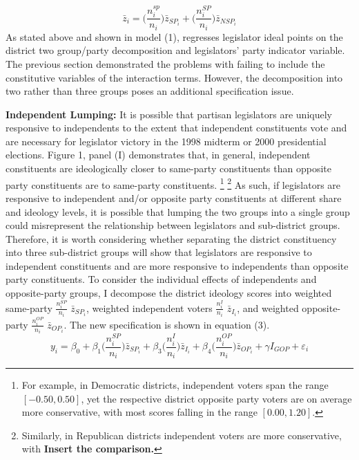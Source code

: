 \documentclass[10pt,letterpaper]{article}
\begin{document}
\begin{equation}
\bar{z}_i = \bigg( \frac{n_i^{sp}}{n_i} \bigg) \bar{z}_{SP_i} + \bigg( \frac{n_i^{SP}}{n_i} \bigg) \bar{z}_{NSP_i}
\end{equation}
As stated above and shown in model (1), \cite{Clinton2006} regresses legislator ideal points on the district two group/party decomposition and legislators' party indicator variable. The previous section demonstrated the problems with failing to include the constitutive variables of the interaction terms. However, the decomposition into two rather than three groups poses an additional specification issue.

\textbf{Independent Lumping:} It is possible that partisan legislators are uniquely responsive to independents to the extent that independent constituents vote and are necessary for legislator victory in the 1998 midterm or 2000 presidential elections.
Figure 1, panel (I) demonstrates that, in general, independent constituents are ideologically closer to same-party constituents than opposite party constituents are to same-party constituents. \footnote{For example, in Democratic districts, independent voters span the range $[-0.50,0.50]$, yet the respective district opposite party voters are on average more conservative, with most scores falling in the range $[0.00,1.20]$.} \footnote{Similarly, in Republican districts independent voters are more conservative, with \textbf{Insert the comparison.}} As such, if legislators are responsive to independent and/or opposite party constituents at different share and ideology levels, it is possible that lumping the two groups into a single group could misrepresent the relationship between legislators and sub-district groups. Therefore, it is worth considering whether separating the district constituency into three sub-district groups will show that legislators are responsive to independent constituents and are more responsive to independents than opposite party constituents. To consider the individual effects of independents and opposite-party groups, I decompose the district ideology scores into weighted same-party $\frac{n_i^{SP}}{n_i}$ $\bar{z}_{SP_i}$, weighted independent voters $\frac{n_i^{I}}{n_i}$ $\bar{z}_{I_i}$, and weighted opposite-party $\frac{n_i^{OP}}{n_i}$ $\bar{z}_{OP_i}$. The new specification is shown in equation (3).
\begin{equation}
y_i  = \beta_0 + \beta_1 \bigg( \frac{n_i^{SP}}{n_i} \bigg) \bar{z}_{SP_i} + \beta_3 \bigg( \frac{n_i^{I}}{n_i} \bigg) \bar{z}_{I_i} + \beta_4 \bigg( \frac{n_i^{OP}}{n_i} \bigg) \bar{z}_{OP_i} + \gamma I_{GOP} + \varepsilon_i
\end{equation}
\end{document}
